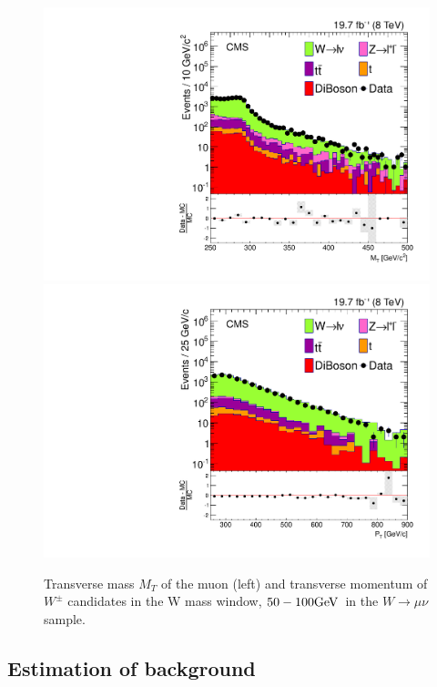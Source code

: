\begin{figure}[!Hhtb]
  \begin{center}
  \includegraphics[scale=0.39]{Figures/sus13009/cut/WlepnuMT.pdf}
  \includegraphics[scale=0.39]{Figures/sus13009/cut/WlepnuPT2_50_100.pdf}
  \caption{Transverse mass $M_{T}$ of the muon (left) and transverse momentum of $W^\pm$ candidates in the W mass window, $50 - 100 \mathrm{GeV}\,$ in the $W \rightarrow \mu \nu$ sample.}
  \label{fig:BKGR_W_mass}
  \end{center}
\end{figure}

\subsection{Estimation of \znunu background}

